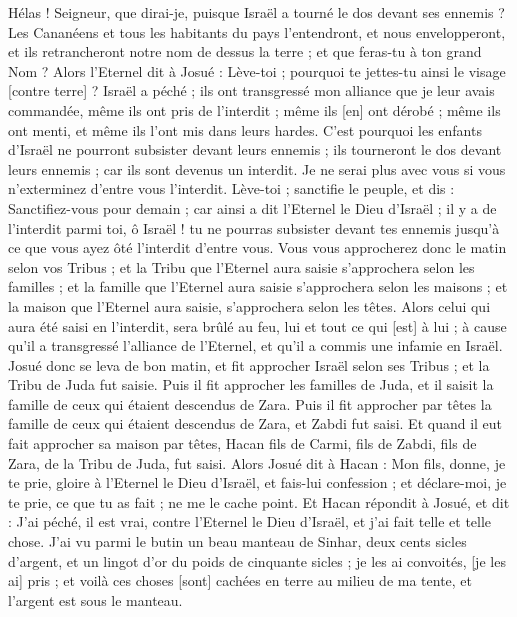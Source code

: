 \begin{multicols}{2}
Hélas ! Seigneur, que dirai-je, puisque Israël a tourné le dos devant ses ennemis ?
Les Cananéens et tous les habitants du pays l'entendront, et nous envelopperont, et ils retrancheront notre nom de dessus la terre ; et que feras-tu à ton grand Nom ?
Alors l'Eternel dit à Josué : Lève-toi ; pourquoi te jettes-tu ainsi le visage [contre terre] ?
Israël a péché ; ils ont transgressé mon alliance que je leur avais commandée, même ils ont pris de l'interdit ; même ils [en] ont dérobé ; même ils ont menti, et même ils l'ont mis dans leurs hardes.
C'est pourquoi les enfants d'Israël ne pourront subsister devant leurs ennemis ; ils tourneront le dos devant leurs ennemis ; car ils sont devenus un interdit. Je ne serai plus avec vous si vous n'exterminez d'entre vous l'interdit.
Lève-toi ; sanctifie le peuple, et dis : Sanctifiez-vous pour demain ; car ainsi a dit l'Eternel le Dieu d'Israël ; il y a de l'interdit parmi toi, ô Israël ! tu ne pourras subsister devant tes ennemis jusqu'à ce que vous ayez ôté l'interdit d'entre vous.
Vous vous approcherez donc le matin selon vos Tribus ; et la Tribu que l'Eternel aura saisie s'approchera selon les familles ; et la famille que l'Eternel aura saisie s'approchera selon les maisons ; et la maison que l'Eternel aura saisie, s'approchera selon les têtes.
Alors celui qui aura été saisi en l'interdit, sera brûlé au feu, lui et tout ce qui [est] à lui ; à cause qu'il a transgressé l'alliance de l'Eternel, et qu'il a commis une infamie en Israël.
Josué donc se leva de bon matin, et fit approcher Israël selon ses Tribus ; et la Tribu de Juda fut saisie.
Puis il fit approcher les familles de Juda, et il saisit la famille de ceux qui étaient descendus de Zara. Puis il fit approcher par têtes la famille de ceux qui étaient descendus de Zara, et Zabdi fut saisi.
Et quand il eut fait approcher sa maison par têtes, Hacan fils de Carmi, fils de Zabdi, fils de Zara, de la Tribu de Juda, fut saisi.
Alors Josué dit à Hacan : Mon fils, donne, je te prie, gloire à l'Eternel le Dieu d'Israël, et fais-lui confession ; et déclare-moi, je te prie, ce que tu as fait ; ne me le cache point.
Et Hacan répondit à Josué, et dit : J'ai péché, il est vrai, contre l'Eternel le Dieu d'Israël, et j'ai fait telle et telle chose.
J'ai vu parmi le butin un beau manteau de Sinhar, deux cents sicles d'argent, et un lingot d'or du poids de cinquante sicles ; je les ai convoités, [je les ai] pris ; et voilà ces choses [sont] cachées en terre au milieu de ma tente, et l'argent est sous le manteau.

\end{multicols}
